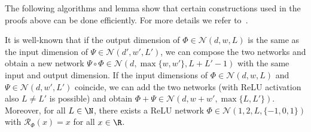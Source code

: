 \documentclass{amsart}[11pt]
\numberwithin{equation}{section}
\newcommand{\nn}{\mathcal{N}}
\newcommand{\realization}{\mathcal{R}}
\numberwithin{theorem}{section}
\begin{document}
The following algorithms and lemma show that certain constructions used in the proofs above can be done efficiently.
For more details we refer to~\cite[Appendix B]{neuralcalc}. 

\begin{remark}
It is well-known that if the output dimension of $\Phi\in \nn(d,w,L)$ is the same as the input dimension of $\Psi\in\nn(d',w',L')$, we can compose the two networks and obtain a new network $\Psi \circ \Phi\in \nn(d,\max\{w,w'\},L+L'-1)$ with the same input and output dimension. 
If the input dimensions of $\Phi\in\nn(d,w,L)$ and $\Psi\in\nn(d,w',L')$ coincide, we can add the two networks (with ReLU activation also $L\neq L'$ is possible) and obtain $\Phi+\Psi\in \nn(d,w+w',\max\{L,L'\})$. Moreover, for all $L\in\N$, there exists a ReLU network $\Phi \in \nn(1, 2, L, \{-1, 0, 1\})$ with $\realization_{\Phi}(x)=x$ for all $x\in\R$.
\end{remark} 
\end{document}
